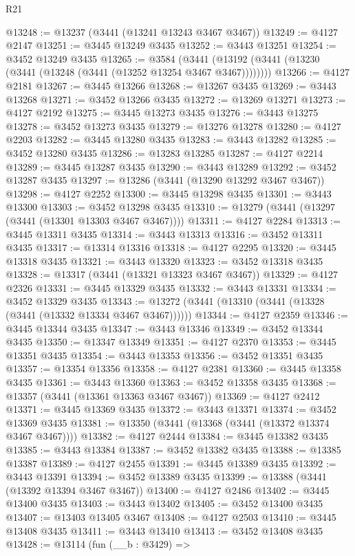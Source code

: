\begin{lexlean}{R21}
\begin{coremodule}
@13248 := @13237 (@3441 (@13241 @13243 @3467 @3467))
@13249 := @4127 @2147
@13251 := @3445 @13249 @3435
@13252 := @3443 @13251
@13254 := @3452 @13249 @3435
@13265 := @3584
    (@3441 (@13192 (@3441 (@13230 (@3441 (@13248 (@3441 (@13252 @13254 @3467 @3467))))))))
@13266 := @4127 @2181
@13267 := @3445 @13266
@13268 := @13267 @3435
@13269 := @3443 @13268
@13271 := @3452 @13266 @3435
@13272 := @13269 @13271
@13273 := @4127 @2192
@13275 := @3445 @13273 @3435
@13276 := @3443 @13275
@13278 := @3452 @13273 @3435
@13279 := @13276 @13278
@13280 := @4127 @2203
@13282 := @3445 @13280 @3435
@13283 := @3443 @13282
@13285 := @3452 @13280 @3435
@13286 := @13283 @13285
@13287 := @4127 @2214
@13289 := @3445 @13287 @3435
@13290 := @3443 @13289
@13292 := @3452 @13287 @3435
@13297 := @13286 (@3441 (@13290 @13292 @3467 @3467))
@13298 := @4127 @2252
@13300 := @3445 @13298 @3435
@13301 := @3443 @13300
@13303 := @3452 @13298 @3435
@13310 := @13279 (@3441 (@13297 (@3441 (@13301 @13303 @3467 @3467))))
@13311 := @4127 @2284
@13313 := @3445 @13311 @3435
@13314 := @3443 @13313
@13316 := @3452 @13311 @3435
@13317 := @13314 @13316
@13318 := @4127 @2295
@13320 := @3445 @13318 @3435
@13321 := @3443 @13320
@13323 := @3452 @13318 @3435
@13328 := @13317 (@3441 (@13321 @13323 @3467 @3467))
@13329 := @4127 @2326
@13331 := @3445 @13329 @3435
@13332 := @3443 @13331
@13334 := @3452 @13329 @3435
@13343 := @13272 (@3441 (@13310 (@3441 (@13328 (@3441 (@13332 @13334 @3467 @3467))))))
@13344 := @4127 @2359
@13346 := @3445 @13344 @3435
@13347 := @3443 @13346
@13349 := @3452 @13344 @3435
@13350 := @13347 @13349
@13351 := @4127 @2370
@13353 := @3445 @13351 @3435
@13354 := @3443 @13353
@13356 := @3452 @13351 @3435
@13357 := @13354 @13356
@13358 := @4127 @2381
@13360 := @3445 @13358 @3435
@13361 := @3443 @13360
@13363 := @3452 @13358 @3435
@13368 := @13357 (@3441 (@13361 @13363 @3467 @3467))
@13369 := @4127 @2412
@13371 := @3445 @13369 @3435
@13372 := @3443 @13371
@13374 := @3452 @13369 @3435
@13381 := @13350 (@3441 (@13368 (@3441 (@13372 @13374 @3467 @3467))))
@13382 := @4127 @2444
@13384 := @3445 @13382 @3435
@13385 := @3443 @13384
@13387 := @3452 @13382 @3435
@13388 := @13385 @13387
@13389 := @4127 @2455
@13391 := @3445 @13389 @3435
@13392 := @3443 @13391
@13394 := @3452 @13389 @3435
@13399 := @13388 (@3441 (@13392 @13394 @3467 @3467))
@13400 := @4127 @2486
@13402 := @3445 @13400 @3435
@13403 := @3443 @13402
@13405 := @3452 @13400 @3435
@13407 := @13403 @13405 @3467
@13408 := @4127 @2503
@13410 := @3445 @13408 @3435
@13411 := @3443 @13410
@13413 := @3452 @13408 @3435
@13428 := @13114
    (fun (__b : @3429) =>

\end{coremodule}
\end{lexlean}
